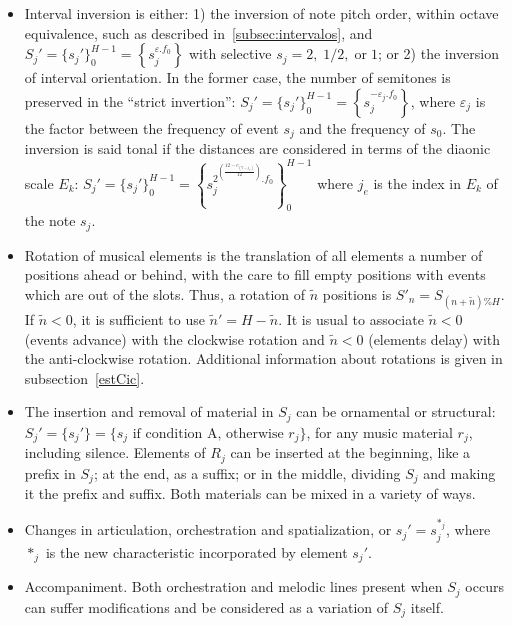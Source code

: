 \begin{itemize}
        \item Interval inversion is either: 1) the inversion of note pitch order, within octave equivalence, such as described in~\ref{subsec:intervalos}, and $S_j'=\{s_j'\}_0^{H-1}=\left\{s_j^{\varepsilon. f_0}\right\}$ with selective $s_j=2,\;1/2,\;\text{or}\;1$; or 2) the inversion of interval orientation. In the former case, the number of semitones
        is preserved in the ``strict invertion'':
        $S_j'=\{s_j'\}_0^{H-1}=\left\{s_j^{-\varepsilon_j . f_0}\right\}$, where
        $\varepsilon_j$ is the factor between the frequency of event $s_j$ and the
        frequency of $s_0$. The inversion is said tonal if the distances are
        considered in terms of the diaonic scale $E_k$:
        $S_j'=\{s_j'\}_0^{H-1}=\left\{s_j^{2^{\left(\frac{12-e_{\left(7-j_e\right)}}{12}\right)}
        . f_0}\right\}_0^{H-1}$ where $j_e$ is the index in
        $E_k$ of the note $s_j$.

        \item Rotation of musical elements is the translation of all elements
        a number of positions ahead or behind, with the care to fill empty positions
        with events which are out of the slots. Thus, a
        rotation of $\tilde{n}$ positions is $S'_n=S_{(n+\tilde{n})\%H}$. If
        $\tilde{n}<0$, it is sufficient to use $\tilde{n}'=H-\tilde{n}$. It is
        usual to associate $\tilde{n}<0$ (events advance) with the clockwise rotation and
        $\tilde{n}<0$ (elements delay) with the anti-clockwise rotation.
        Additional information about rotations is given in subsection~\ref{estCic}.

        \item The insertion and removal of material in $S_j$ can be
    ornamental or structural: $S_j'=\{s_j'\}=\{s_j \text{ if condition A,
    otherwise } r_j\}$, for any music material $r_j$, including silence.
    Elements of $R_j$ can be inserted at the beginning, like a prefix
    in $S_j$; at the end, as a suffix; or in the middle, dividing $S_j$ and making
    it the prefix and suffix. Both materials can be mixed in a variety of ways.

    \item Changes in articulation, orchestration and spatialization, or
    $s_j'=s_j^{*_j}$, where $*_j$ is the new characteristic incorporated by 
    element $s_j'$.
    
    \item Accompaniment. Both orchestration and melodic lines present when $S_j$ occurs can suffer modifications and be considered as a variation of $S_j$ itself.
\end{itemize}

